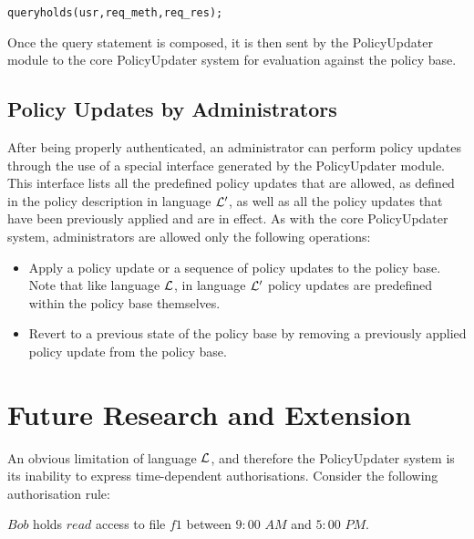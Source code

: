 \documentclass[global,twocolumn,final]{svjour}
\newenvironment{vquote}
  {\begin{list}{}{\leftmargin 1em}\item[]}
  {\end{list}}
\newenvironment{vverbatim}
  {\begin{alltt}}
  {\vspace{-\baselineskip}\end{alltt}}
\begin{document}
      \begin{vverbatim}
  query holds(usr, req\_meth, req\_res);
      \end{vverbatim}

      Once the query statement is composed, it is then sent by the
      PolicyUpdater module to the core PolicyUpdater system for evaluation
      against the policy base.

    \subsection{Policy Updates by Administrators}

      After being properly authenticated, an administrator can perform policy
      updates through the use of a special interface generated by the
      PolicyUpdater module. This interface lists all the predefined policy
      updates that are allowed, as defined in the policy description in
      language ${\cal L'}$, as well as all the policy updates that have been
      previously applied and are in effect. As with the core PolicyUpdater
      system, administrators are allowed only the following operations:

      \begin{itemize}
        \item
          Apply a policy update or a sequence of policy updates to the policy
          base. Note that like language ${\cal L}$, in language ${\cal L'}$
          policy updates are predefined within the policy base themselves.
        \item
          Revert to a previous state of the policy base by removing a
          previously applied policy update from the policy base.
      \end{itemize}

  \section{Future Research and Extension}
    \label{sec-future}

    An obvious limitation of language ${\cal L}$, and therefore the
    PolicyUpdater system is its inability to express time-dependent
    authorisations. Consider the following authorisation rule:

    \begin{vquote}
      $Bob$ holds $read$ access to file $f1$ between $9:00$ $AM$ and $5:00$
      $PM$.
    \end{vquote}
\end{document}
